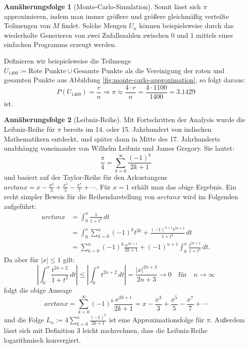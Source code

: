 \documentclass{scrartcl}
\theoremstyle{definition}
\newtheorem{approximation sequence}{Annäherungsfolge}
\begin{document}
\begin{approximation sequence}[Monte-Carlo-Simulation]
Somit lässt sich \(\pi\) approximieren, indem man immer größere und größere
gleichmäßig verteilte Teilmengen von \(M\) findet. Solche Mengen \(U_n\) können
beispielsweise durch das wiederholte Generieren von zwei Zufallszahlen zwischen
0 und 1 mittels eines einfachen Programms erzeugt werden.

Definieren wir beispielsweise die Teilmenge \(U_{1400} \coloneq \text{Rote
Punkte} \cup \text{Gesamte Punkte}\) als die Vereinigung der roten und gesamten
Punkte aus Abbildung \autoref{fig:monte-carlo-approximation}, so folgt daraus:
\begin{equation}
    P(U_{1400}) = \frac{r}{n} \Rightarrow \pi \approx \frac{4 \cdot r}{n} = \frac{4 \cdot 1100}{1400} = 3.1429
\end{equation}
ist.

\end{approximation sequence}

\begin{approximation sequence}[Leibniz-Reihe]
Mit Fortschritten der Analysis wurde die Leibniz-Reihe für \(\pi\) bereits im
14. oder 15. Jahrhundert von indischen Mathematikern entdeckt, und später dann
in Mitte des 17. Jahrhunderts unabhängig voneinander von Wilhelm Leibniz und
James Gregory. Sie lautet:
\begin{equation*}
    \frac{\pi}{4} = \sum_{k=0}^{\infty} \frac{(-1)^k}{2k+1}
\end{equation*}
und basiert auf der Taylor-Reihe für den Arkustangens \(arctanx = x -
\frac{x^3}{3} + \frac{x^5}{5} - \frac{x^7}{7} + \cdots\).
Für \(x = 1\) erhält man das obige Ergebnis. Ein recht simpler Beweis für die
Reihendarstellung von \(arctanx\) wird im Folgenden aufgeführt:
\cite{Leibniz}
\begin{equation}
    \begin{split}
        arctanx & = \int_{0}^{x} \frac{1}{1+t^2}\,dt                                                               \\
                & = \int_{0}^{x}\sum_{k=0}^{n}(-1)^k t^{2k} + \frac{(-1)^{n+1}t^{2n+2}}{1+t^2}\,dt                 \\
                & = \sum_{k=0}^{n}(-1)^k \frac{x^{2k+1}}{2k+1} + (-1)^{n+1}\int_{0}^{x}\frac{t^{2n+2}}{1+t^2}\,dt.
    \end{split}
\end{equation}
Da aber für \(|x| \leqslant 1\) gilt:
\begin{equation*}
    \left|\int_{0}^{x}\frac{t^{2n+2}}{1+t^2}\,dt\right| \leqslant \left|\int_{0}^{x}t^{2n+2}\,dt\right|
    = \frac{|x|^{2n+3}}{2n+3} \rightarrow 0 \quad \text{für} \quad n \rightarrow \infty
\end{equation*}
folgt die obige Aussage
\begin{equation*}
    arctanx = \sum_{k=0}^{\infty}(-1)^k \frac{x^{2k+1}}{2k+1} = x - \frac{x^3}{3} + \frac{x^5}{5} - \frac{x^7}{7} + \cdots
\end{equation*}
und die Folge \(L_n := 4\sum_{k=0}^{n} \frac{(-1)^k}{2k+1} \) ist eine
Approximationsfolge für \(\pi\). Außerdem lässt sich mit Definition 3 leicht
nachrechnen, dass die Leibniz-Reihe logarithmisch konvergiert.
\end{approximation sequence}
\end{document}
